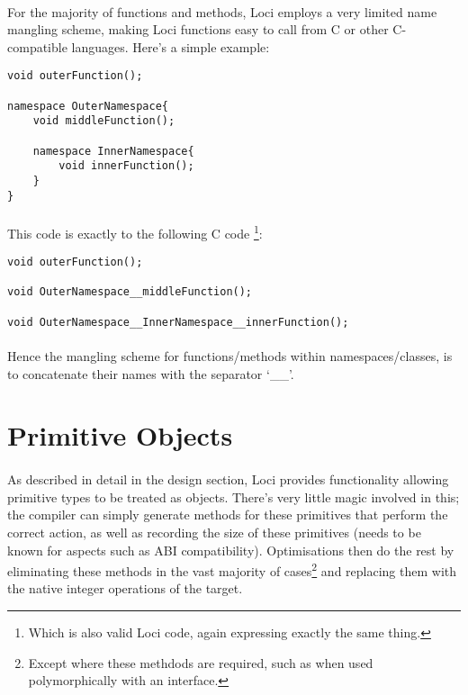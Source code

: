\documentclass[12pt,twoside,notitlepage]{report}
\begin{document}
\paragraph{}
For the majority of functions and methods, Loci employs a very limited name mangling scheme, making Loci functions easy to call from C or other C-compatible languages. Here's a simple example:

\begin{lstlisting}
void outerFunction();

namespace OuterNamespace{
	void middleFunction();
	
	namespace InnerNamespace{
		void innerFunction();
	}
}
\end{lstlisting}

\paragraph{}
This code is exactly to the following C code \footnote{Which is also valid Loci code, again expressing exactly the same thing.}:

\begin{lstlisting}
void outerFunction();

void OuterNamespace__middleFunction();

void OuterNamespace__InnerNamespace__innerFunction();
\end{lstlisting}

\paragraph{}
Hence the mangling scheme for functions/methods within namespaces/classes, is to concatenate their names with the separator `\_\_'.

\section{Primitive Objects}

\paragraph{}
As described in detail in the design section, Loci provides functionality allowing primitive types to be treated as objects. There's very little magic involved in this; the compiler can simply generate methods for these primitives that perform the correct action, as well as recording the size of these primitives (needs to be known for aspects such as ABI compatibility). Optimisations then do the rest by eliminating these methods in the vast majority of cases\footnote{Except where these methdods are required, such as when used polymorphically with an interface.} and replacing them with the native integer operations of the target.
\end{document}
